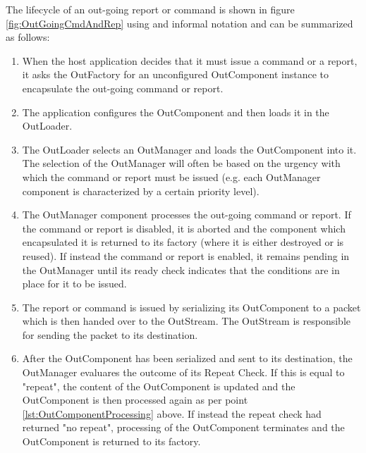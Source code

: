 The lifecycle of an out-going report or command is shown in figure \ref{fig:OutGoingCmdAndRep} using and informal notation and can be summarized as follows:
\begin{enumerate}
\item When the host application decides that it must issue a command or a report, it asks the OutFactory for an unconfigured OutComponent instance to encapsulate the out-going command or report.
\item The application configures the OutComponent and then loads it in the OutLoader.
\item The OutLoader selects an OutManager and loads the OutComponent into it. The selection of the OutManager will often be based on the urgency with which the command or report must be issued (e.g. each OutManager component is characterized by a certain priority level). 
\item\label{lst:OutComponentProcessing} The OutManager component processes the out-going command or report. If the command or report is disabled, it is aborted and the component which encapsulated it is returned to its factory (where it is either destroyed or is reused). If instead the command or report is enabled, it remains pending in the OutManager until its ready check indicates that the conditions are in place for it to be issued. 
\item The report or command is issued by serializing its OutComponent to a packet which is then handed over to the OutStream. The OutStream is responsible for sending the packet to its destination. 
\item After the OutComponent has been serialized and sent to its destination, the OutManager evaluares the outcome of its Repeat Check. If this is equal to "repeat", the content of the OutComponent is updated and the OutComponent is then processed again as per point \ref{lst:OutComponentProcessing} above. If instead the repeat check had returned "no repeat", processing of the OutComponent terminates and the OutComponent is returned to its factory.
\end{enumerate}


